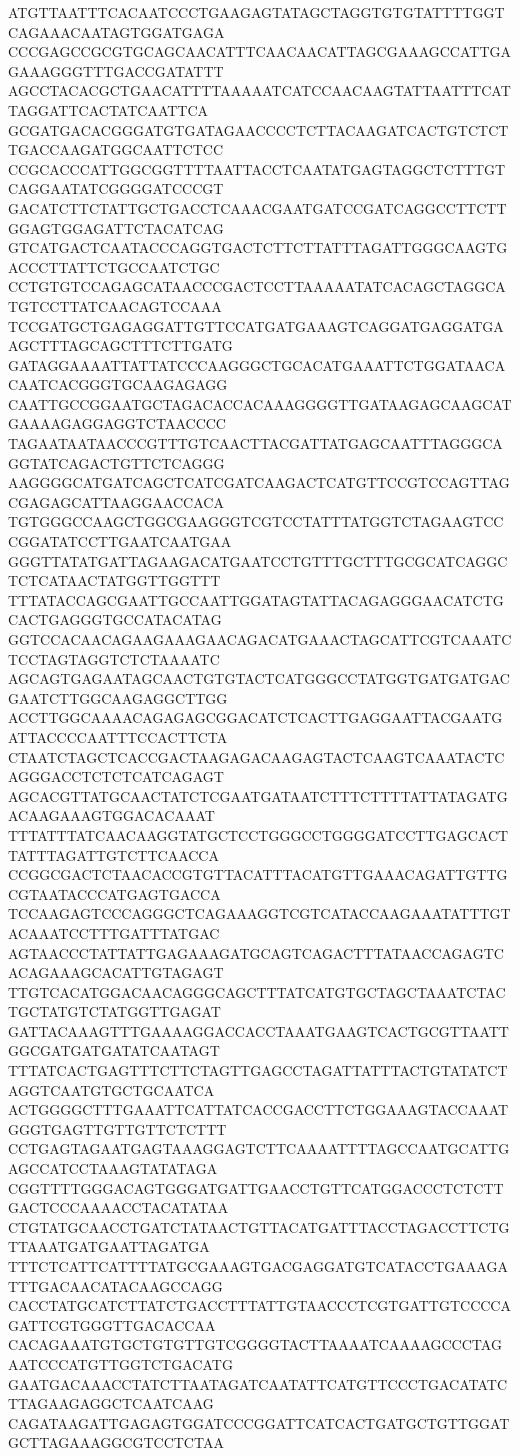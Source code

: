 ATGTTAATTTCACAATCCCTGAAGAGTATAGCTAGGTGTGTATTTTGGTCAGAAACAATAGTGGATGAGA
CCCGAGCCGCGTGCAGCAACATTTCAACAACATTAGCGAAAGCCATTGAGAAAGGGTTTGACCGATATTT
AGCCTACACGCTGAACATTTTAAAAATCATCCAACAAGTATTAATTTCATTAGGATTCACTATCAATTCA
GCGATGACACGGGATGTGATAGAACCCCTCTTACAAGATCACTGTCTCTTGACCAAGATGGCAATTCTCC
CCGCACCCATTGGCGGTTTTAATTACCTCAATATGAGTAGGCTCTTTGTCAGGAATATCGGGGATCCCGT
GACATCTTCTATTGCTGACCTCAAACGAATGATCCGATCAGGCCTTCTTGGAGTGGAGATTCTACATCAG
GTCATGACTCAATACCCAGGTGACTCTTCTTATTTAGATTGGGCAAGTGACCCTTATTCTGCCAATCTGC
CCTGTGTCCAGAGCATAACCCGACTCCTTAAAAATATCACAGCTAGGCATGTCCTTATCAACAGTCCAAA
TCCGATGCTGAGAGGATTGTTCCATGATGAAAGTCAGGATGAGGATGAAGCTTTAGCAGCTTTCTTGATG
GATAGGAAAATTATTATCCCAAGGGCTGCACATGAAATTCTGGATAACACAATCACGGGTGCAAGAGAGG
CAATTGCCGGAATGCTAGACACCACAAAGGGGTTGATAAGAGCAAGCATGAAAAGAGGAGGTCTAACCCC
TAGAATAATAACCCGTTTGTCAACTTACGATTATGAGCAATTTAGGGCAGGTATCAGACTGTTCTCAGGG
AAGGGGCATGATCAGCTCATCGATCAAGACTCATGTTCCGTCCAGTTAGCGAGAGCATTAAGGAACCACA
TGTGGGCCAAGCTGGCGAAGGGTCGTCCTATTTATGGTCTAGAAGTCCCGGATATCCTTGAATCAATGAA
GGGTTATATGATTAGAAGACATGAATCCTGTTTGCTTTGCGCATCAGGCTCTCATAACTATGGTTGGTTT
TTTATACCAGCGAATTGCCAATTGGATAGTATTACAGAGGGAACATCTGCACTGAGGGTGCCATACATAG
GGTCCACAACAGAAGAAAGAACAGACATGAAACTAGCATTCGTCAAATCTCCTAGTAGGTCTCTAAAATC
AGCAGTGAGAATAGCAACTGTGTACTCATGGGCCTATGGTGATGATGACGAATCTTGGCAAGAGGCTTGG
ACCTTGGCAAAACAGAGAGCGGACATCTCACTTGAGGAATTACGAATGATTACCCCAATTTCCACTTCTA
CTAATCTAGCTCACCGACTAAGAGACAAGAGTACTCAAGTCAAATACTCAGGGACCTCTCTCATCAGAGT
AGCACGTTATGCAACTATCTCGAATGATAATCTTTCTTTTATTATAGATGACAAGAAAGTGGACACAAAT
TTTATTTATCAACAAGGTATGCTCCTGGGCCTGGGGATCCTTGAGCACTTATTTAGATTGTCTTCAACCA
CCGGCGACTCTAACACCGTGTTACATTTACATGTTGAAACAGATTGTTGCGTAATACCCATGAGTGACCA
TCCAAGAGTCCCAGGGCTCAGAAAGGTCGTCATACCAAGAAATATTTGTACAAATCCTTTGATTTATGAC
AGTAACCCTATTATTGAGAAAGATGCAGTCAGACTTTATAACCAGAGTCACAGAAAGCACATTGTAGAGT
TTGTCACATGGACAACAGGGCAGCTTTATCATGTGCTAGCTAAATCTACTGCTATGTCTATGGTTGAGAT
GATTACAAAGTTTGAAAAGGACCACCTAAATGAAGTCACTGCGTTAATTGGCGATGATGATATCAATAGT
TTTATCACTGAGTTTCTTCTAGTTGAGCCTAGATTATTTACTGTATATCTAGGTCAATGTGCTGCAATCA
ACTGGGGCTTTGAAATTCATTATCACCGACCTTCTGGAAAGTACCAAATGGGTGAGTTGTTGTTCTCTTT
CCTGAGTAGAATGAGTAAAGGAGTCTTCAAAATTTTAGCCAATGCATTGAGCCATCCTAAAGTATATAGA
CGGTTTTGGGACAGTGGGATGATTGAACCTGTTCATGGACCCTCTCTTGACTCCCAAAACCTACATATAA
CTGTATGCAACCTGATCTATAACTGTTACATGATTTACCTAGACCTTCTGTTAAATGATGAATTAGATGA
TTTCTCATTCATTTTATGCGAAAGTGACGAGGATGTCATACCTGAAAGATTTGACAACATACAAGCCAGG
CACCTATGCATCTTATCTGACCTTTATTGTAACCCTCGTGATTGTCCCCAGATTCGTGGGTTGACACCAA
CACAGAAATGTGCTGTGTTGTCGGGGTACTTAAAATCAAAAGCCCTAGAATCCCATGTTGGTCTGACATG
GAATGACAAACCTATCTTAATAGATCAATATTCATGTTCCCTGACATATCTTAGAAGAGGCTCAATCAAG
CAGATAAGATTGAGAGTGGATCCCGGATTCATCACTGATGCTGTTGGATGCTTAGAAAGGCGTCCTCTAA
